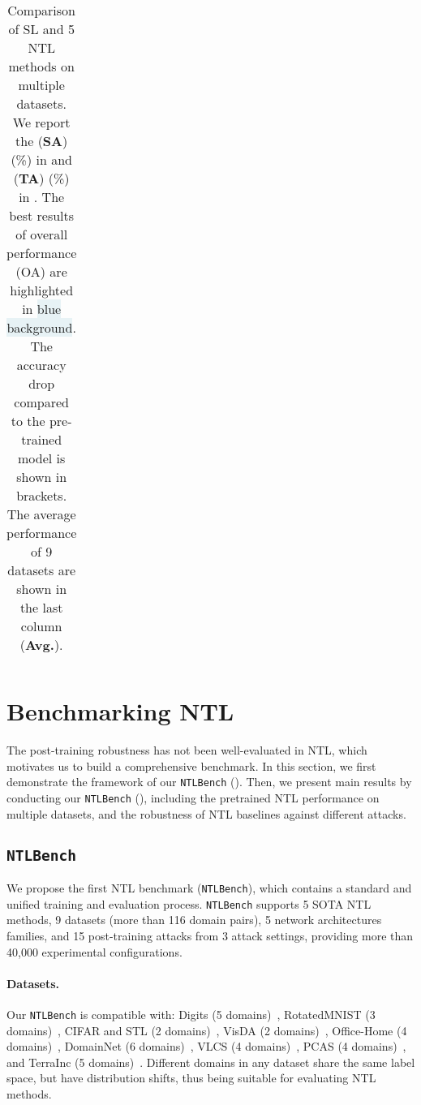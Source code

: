 \begin{table*}[ht!]
\begin{tabular}{c|cc|cc|cc|cc|cc|cc|cc|cc|cc||cc}
      \bottomrule
    \end{tabular}
    \vspace{-3mm}
    \caption{Comparison of SL and 5 NTL methods on multiple datasets. We report the  (\textbf{SA}) (\%) in  and  (\textbf{TA}) (\%) in . The best results of overall performance (OA) are highlighted in \colorbox[HTML]{E7F2F5}{blue background}. The accuracy drop compared to the pre-trained model is shown in brackets. The average performance of 9 datasets are shown in the last column (\textbf{Avg.}).}
    \label{tab:tgt-spec}
    \vspace{-4mm}
  \end{table*}
  
  
  


\section{Benchmarking NTL}
\label{sec:exp}

The post-training robustness has not been well-evaluated in NTL, which motivates us to build a comprehensive benchmark.
In this section, we first demonstrate the framework of our \texttt{NTLBench} (). Then, we present main results by conducting our \texttt{NTLBench} (), including the pretrained NTL performance on multiple datasets, and the robustness of NTL baselines against different attacks. 


\subsection{\texttt{NTLBench}}
\label{sec:ntlbench}

We propose the first NTL benchmark (\texttt{NTLBench}), which contains a standard and unified training and evaluation process. \texttt{NTLBench} supports 5 SOTA NTL methods, 9 datasets (more than 116 domain pairs), 5 network architectures families, and 15 post-training attacks from 3 attack settings, providing more than 40,000 experimental configurations. 

\paragraph{Datasets.} Our \texttt{NTLBench} is compatible with: Digits (5 domains)~\cite{deng2012mnist,hull1994database,netzer2011reading,ganin2016domain,roy2018effects}, RotatedMNIST (3 domains)~\cite{ghifary2015domain}, CIFAR and STL (2 domains)~\cite{krizhevsky2009learning,coates2011analysis}, VisDA (2 domains)~\cite{peng2017visda}, Office-Home (4 domains)~\cite{venkateswara2017deep}, DomainNet (6 domains)~\cite{peng2019moment}, VLCS (4 domains)~\cite{fang2013unbiased}, PCAS (4 domains)~\cite{li2017deeper}, and TerraInc (5 domains)~\cite{beery2018recognition}. Different domains in any dataset share the same label space, but have distribution shifts, thus being suitable for evaluating NTL methods.

